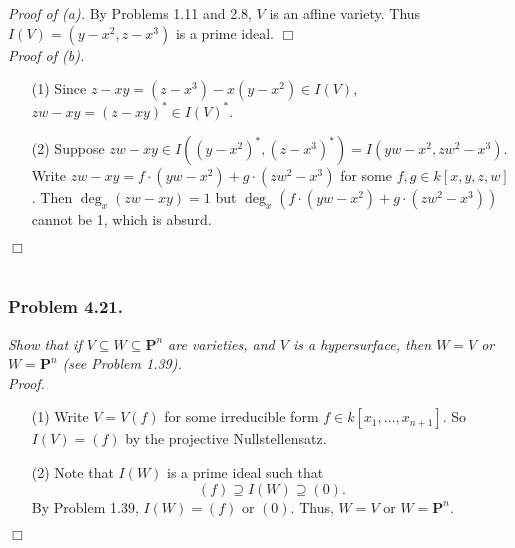 \documentclass{article}
\begin{document}
\emph{Proof of (a).}
  By Problems 1.11 and 2.8, $V$ is an affine variety.
  Thus $I(V) = (y-x^2, z-x^3)$ is a prime ideal.
$\Box$ \\



\emph{Proof of (b).}
\begin{enumerate}
\item[(1)]
  Since $z - xy = (z-x^3) - x(y-x^2) \in I(V)$,
  $zw - xy = (z - xy)^{*} \in I(V)^{*}$.

\item[(2)]
  Suppose $zw - xy \in I((y-x^2)^{*}, (z-x^3)^{*}) = I(yw-x^2, zw^2-x^3)$.
  Write $zw - xy = f \cdot (yw-x^2) + g \cdot (zw^2-x^3)$ for some $f,g \in k[x,y,z,w]$.
  Then $\deg_{x}(zw - xy) = 1$
  but $\deg_{x}(f \cdot (yw-x^2) + g \cdot (zw^2-x^3))$ cannot be 1, which is absurd.
\end{enumerate}
$\Box$ \\\\






\subsubsection*{Problem 4.21.}
\emph{Show that if $V \subseteq W \subseteq \mathbf{P}^{n}$ are varieties,
and $V$ is a hypersurface, then $W = V$ or $W = \mathbf{P}^{n}$
(see Problem 1.39).} \\



\emph{Proof.}
\begin{enumerate}
\item[(1)]
  Write $V = V(f)$ for some irreducible form $f \in k[x_1,\ldots,x_{n+1}]$.
  So $I(V) = (f)$ by the projective Nullstellensatz.

\item[(2)]
  Note that $I(W)$ is a prime ideal such that
  \[
    (f) \supseteq I(W) \supseteq (0).
  \]
  By Problem 1.39, $I(W) = (f)$ or $(0)$.
  Thus, $W = V$ or $W = \mathbf{P}^{n}$.
\end{enumerate}
$\Box$ \\\\



\end{document}
